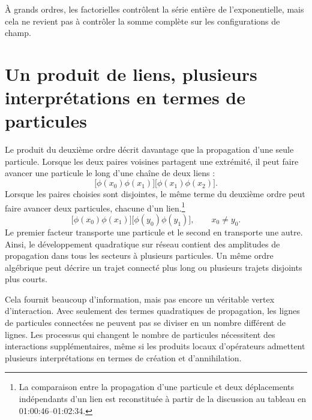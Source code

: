À grands ordres, les factorielles contrôlent la série entière de l’exponentielle, mais cela ne revient pas à contrôler la somme complète sur les configurations de champ.

\begin{classroomqa}
\end{classroomqa}

\section{Un produit de liens, plusieurs interprétations en termes de particules}

Le produit du deuxième ordre décrit davantage que la propagation d’une seule particule. Lorsque les deux paires voisines partagent une extrémité, il peut faire avancer une particule le long d’une chaîne de deux liens :
\begin{equation}
\bigl[\phi(x_0)\phi(x_1)\bigr]
\bigl[\phi(x_1)\phi(x_2)\bigr].
\end{equation}
Lorsque les paires choisies sont disjointes, le même terme du deuxième ordre peut faire avancer deux particules, chacune d’un lien.\footnote{La comparaison entre la propagation d’une particule et deux déplacements indépendants d’un lien est reconstituée à partir de la discussion au tableau en 01:00:46--01:02:34.}
\begin{equation}
\bigl[\phi(x_0)\phi(x_1)\bigr]
\bigl[\phi(y_0)\phi(y_1)\bigr],
\qquad x_0\neq y_0.
\end{equation}
Le premier facteur transporte une particule et le second en transporte une autre. Ainsi, le développement quadratique sur réseau contient des amplitudes de propagation dans tous les secteurs à plusieurs particules. Un même ordre algébrique peut décrire un trajet connecté plus long ou plusieurs trajets disjoints plus courts.

Cela fournit beaucoup d’information, mais pas encore un véritable vertex d’interaction. Avec seulement des termes quadratiques de propagation, les lignes de particules connectées ne peuvent pas se diviser en un nombre différent de lignes. Les processus qui changent le nombre de particules nécessitent des interactions supplémentaires, même si les produits locaux d’opérateurs admettent plusieurs interprétations en termes de création et d’annihilation.

